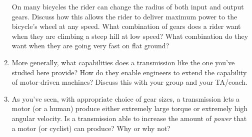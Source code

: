 \documentclass[12pt]{article}
\begin{document}
\begin{enumerate}
On many bicycles the rider can change the radius of both input and output gears. Discuss how this allows the rider to deliver maximum power to the bicycle's wheel at any speed. What combination of gears does a rider want when they are climbing a steep hill at low speed? What combination do they want when they are going very fast on flat ground?

\vspace{2in}

\item More generally, what capabilities does a transmission like the one you've studied here provide? How do they enable engineers to extend the capability of motor-driven machines? Discuss this with your group and your TA/coach.

\vspace{1.5in}


\item As you've seen, with appropriate choice of gear sizes, a transmission lets a motor (or a human) produce either extremely large torque or extremely high angular velocity. Is a transmission able to increase the amount of {\it power} that a motor (or cyclist) can produce? Why or why not?

\vspace{1.5in}


\end{enumerate}

\newpage
\end{document}
